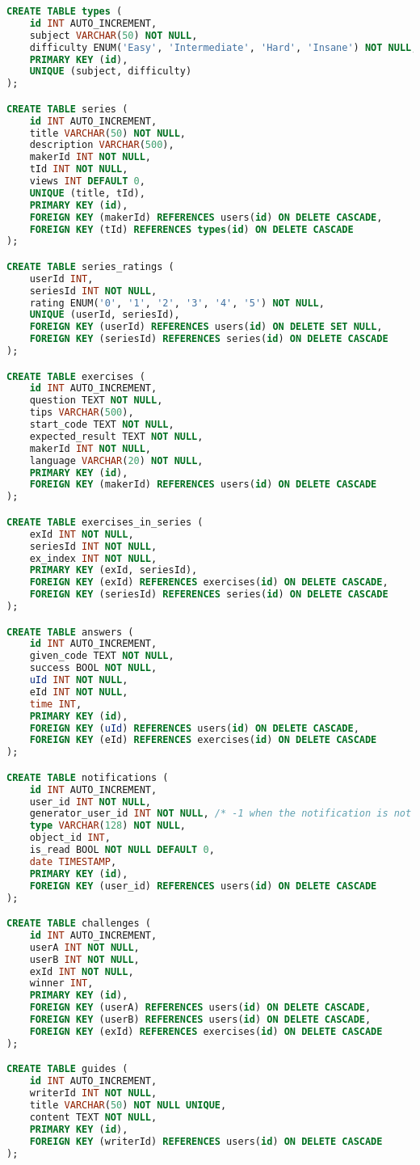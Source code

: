 \begin{lstlisting}[language=sql]
CREATE TABLE types (
    id INT AUTO_INCREMENT,
    subject VARCHAR(50) NOT NULL,
    difficulty ENUM('Easy', 'Intermediate', 'Hard', 'Insane') NOT NULL,
    PRIMARY KEY (id),
    UNIQUE (subject, difficulty)
);

CREATE TABLE series (
    id INT AUTO_INCREMENT,
    title VARCHAR(50) NOT NULL,
    description VARCHAR(500),
    makerId INT NOT NULL,
    tId INT NOT NULL,
	views INT DEFAULT 0,
    UNIQUE (title, tId),
    PRIMARY KEY (id),
    FOREIGN KEY (makerId) REFERENCES users(id) ON DELETE CASCADE,
    FOREIGN KEY (tId) REFERENCES types(id) ON DELETE CASCADE
);

CREATE TABLE series_ratings (
    userId INT,
    seriesId INT NOT NULL,
    rating ENUM('0', '1', '2', '3', '4', '5') NOT NULL,
    UNIQUE (userId, seriesId),
    FOREIGN KEY (userId) REFERENCES users(id) ON DELETE SET NULL,
    FOREIGN KEY (seriesId) REFERENCES series(id) ON DELETE CASCADE
);

CREATE TABLE exercises (
    id INT AUTO_INCREMENT,
    question TEXT NOT NULL,
    tips VARCHAR(500),
    start_code TEXT NOT NULL,
    expected_result TEXT NOT NULL,
    makerId INT NOT NULL,
    language VARCHAR(20) NOT NULL,
    PRIMARY KEY (id),
    FOREIGN KEY (makerId) REFERENCES users(id) ON DELETE CASCADE
);

CREATE TABLE exercises_in_series (
    exId INT NOT NULL,
    seriesId INT NOT NULL,
    ex_index INT NOT NULL,
    PRIMARY KEY (exId, seriesId),
    FOREIGN KEY (exId) REFERENCES exercises(id) ON DELETE CASCADE,
    FOREIGN KEY (seriesId) REFERENCES series(id) ON DELETE CASCADE
);

CREATE TABLE answers (
    id INT AUTO_INCREMENT,
    given_code TEXT NOT NULL,
    success BOOL NOT NULL,
    uId INT NOT NULL,
    eId INT NOT NULL,
    time INT,
    PRIMARY KEY (id),
    FOREIGN KEY (uId) REFERENCES users(id) ON DELETE CASCADE,
    FOREIGN KEY (eId) REFERENCES exercises(id) ON DELETE CASCADE
);

CREATE TABLE notifications (
    id INT AUTO_INCREMENT,
    user_id INT NOT NULL,
    generator_user_id INT NOT NULL, /* -1 when the notification is not generated by another user */
    type VARCHAR(128) NOT NULL,
    object_id INT,
    is_read BOOL NOT NULL DEFAULT 0,
    date TIMESTAMP,
    PRIMARY KEY (id),
    FOREIGN KEY (user_id) REFERENCES users(id) ON DELETE CASCADE
);

CREATE TABLE challenges (
    id INT AUTO_INCREMENT,
    userA INT NOT NULL,
    userB INT NOT NULL,
    exId INT NOT NULL,
    winner INT,
    PRIMARY KEY (id),
    FOREIGN KEY (userA) REFERENCES users(id) ON DELETE CASCADE,
    FOREIGN KEY (userB) REFERENCES users(id) ON DELETE CASCADE,
    FOREIGN KEY (exId) REFERENCES exercises(id) ON DELETE CASCADE
);

CREATE TABLE guides (
    id INT AUTO_INCREMENT,
    writerId INT NOT NULL,
    title VARCHAR(50) NOT NULL UNIQUE,
    content TEXT NOT NULL,
    PRIMARY KEY (id),
    FOREIGN KEY (writerId) REFERENCES users(id) ON DELETE CASCADE
);

\end{lstlisting}
